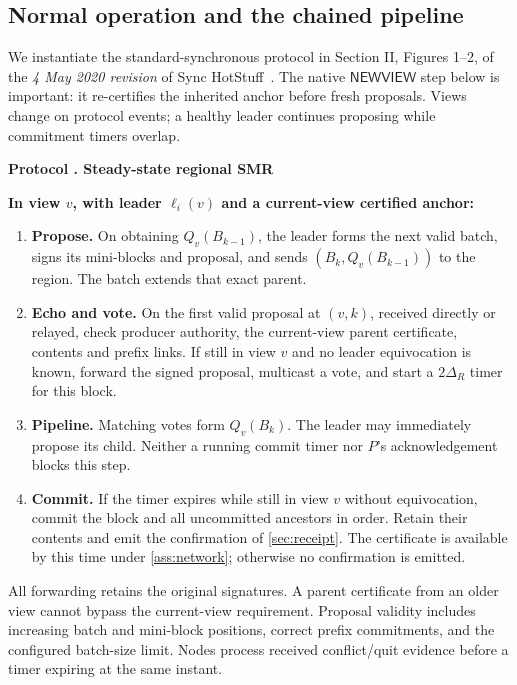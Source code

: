 \documentclass[11pt,a4paper,onecolumn]{article}
\newcommand{\Tag}[1]{\ensuremath{\mathsf{#1}}}
\newcounter{protocol}
\newenvironment{protocol}[2]{\refstepcounter{protocol}\label{#1}
\begin{mdframed}[nobreak=true,linewidth=.6pt,skipabove=9pt,skipbelow=9pt,
innertopmargin=7pt,innerbottommargin=7pt]\small
\noindent\textbf{Protocol \theprotocol. #2}\par\smallskip}{\end{mdframed}}
\begin{document}
\subsection{Normal operation and the chained pipeline}
We instantiate the standard-synchronous protocol in Section II, Figures 1--2,
of the \emph{4 May 2020 revision} of Sync HotStuff~\cite{synchotstuff}.
The native \Tag{NEWVIEW} step below is important: it re-certifies the inherited
anchor before fresh proposals. Views change on protocol events; a healthy
leader continues proposing while commitment timers overlap.

\begin{protocol}{alg:steady}{Steady-state regional SMR}
\textbf{In view $v$, with leader $\ell_i(v)$ and a current-view certified anchor:}
\begin{enumerate}[label=\textbf{S\arabic*.}]
\item \textbf{Propose.} On obtaining $Q_v(B_{k-1})$, the leader forms the
next valid batch, signs its mini-blocks and proposal, and sends
$(B_k,Q_v(B_{k-1}))$ to the region. The batch extends that exact parent.
\item \textbf{Echo and vote.} On the first valid proposal at $(v,k)$, received
directly or relayed, check producer authority, the current-view parent
certificate, contents and prefix links. If still in view $v$ and no leader
equivocation is known, forward the signed proposal, multicast a vote, and
start a $2\Delta_R$ timer for this block.
\item \textbf{Pipeline.} Matching votes form $Q_v(B_k)$. The leader may
immediately propose its child. Neither a running commit timer nor $P$'s
acknowledgement blocks this step.
\item \textbf{Commit.} If the timer expires while still in view $v$ without
equivocation, commit the block and all uncommitted ancestors in order.
Retain their contents and emit the confirmation of \cref{sec:receipt}.
The certificate is available by this time under \cref{ass:network};
otherwise no confirmation is emitted.
\end{enumerate}
\end{protocol}

All forwarding retains the original signatures. A parent certificate from an
older view cannot bypass the current-view requirement. Proposal validity
includes increasing batch and mini-block positions, correct prefix commitments,
and the configured batch-size limit. Nodes process received conflict/quit
evidence before a timer expiring at the same instant.
\end{document}
